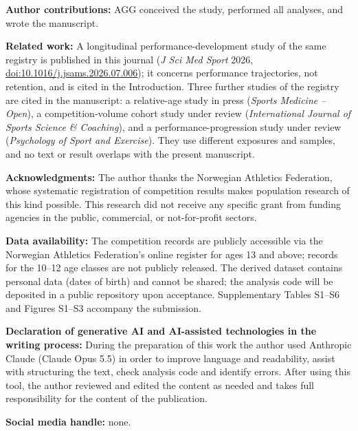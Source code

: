 \documentclass[12pt,a4paper]{article}
\begin{document}
\medskip
\noindent\textbf{Author contributions:} AGG conceived the study, performed all analyses, and wrote the manuscript.

\medskip
\noindent\textbf{Related work:} A longitudinal performance-development study of the same registry is published in this journal (\emph{J Sci Med Sport} 2026, \href{https://doi.org/10.1016/j.jsams.2026.07.006}{doi:10.1016/j.jsams.2026.07.006}); it concerns performance trajectories, not retention, and is cited in the Introduction. Three further studies of the registry are cited in the manuscript: a relative-age study in press (\emph{Sports Medicine -- Open}), a competition-volume cohort study under review (\emph{International Journal of Sports Science \& Coaching}), and a performance-progression study under review (\emph{Psychology of Sport and Exercise}). They use different exposures and samples, and no text or result overlaps with the present manuscript.

\medskip
\noindent\textbf{Acknowledgments:} The author thanks the Norwegian Athletics Federation, whose systematic registration of competition results makes population research of this kind possible. This research did not receive any specific grant from funding agencies in the public, commercial, or not-for-profit sectors.

\medskip
\noindent\textbf{Data availability:} The competition records are publicly accessible via the Norwegian Athletics Federation's online register for ages 13 and above; records for the 10--12 age classes are not publicly released. The derived dataset contains personal data (dates of birth) and cannot be shared; the analysis code will be deposited in a public repository upon acceptance. Supplementary Tables S1--S6 and Figures S1--S3 accompany the submission.

\medskip
\noindent\textbf{Declaration of generative AI and AI-assisted technologies in the writing process:} During the preparation of this work the author used Anthropic Claude (Claude Opus 5.5) in order to improve language and readability, assist with structuring the text, check analysis code and identify errors. After using this tool, the author reviewed and edited the content as needed and takes full responsibility for the content of the publication.

\medskip
\noindent\textbf{Social media handle:} none.
\end{document}
